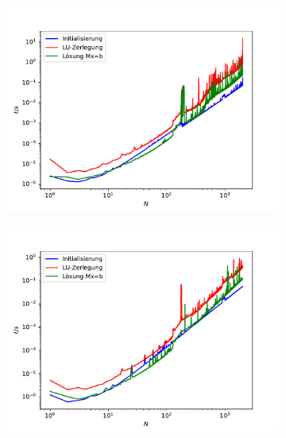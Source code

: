 \documentclass{scrartcl}
\begin{document}
		\begin{figure}[h]
		\centering
		\begin{subfigure}{0.8\textwidth}
		\includegraphics[width=\textwidth]{A2/build/timers_lin.pdf}
		\end{subfigure}
		\begin{subfigure}{0.4\textwidth}
		\includegraphics[width=\textwidth]{build/timers_lin_PC.pdf}
		\end{subfigure}
		\begin{subfigure}{0.4\textwidth}

\end{subfigure}
\end{figure}
\end{document}
